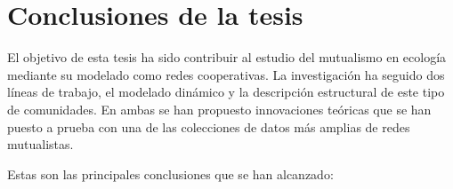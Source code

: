 
\chapter{Conclusiones de la tesis} %

\label{chapterCONCLUSIONES} %

El objetivo de esta tesis ha sido contribuir al estudio del mutualismo en ecología mediante su modelado como redes cooperativas. La investigación ha seguido dos líneas de trabajo, el modelado dinámico y la descripción estructural de este tipo de comunidades. En ambas se han propuesto innovaciones teóricas que se han puesto a prueba con una de las colecciones de datos más amplias de redes mutualistas.

Estas son las principales conclusiones que se han alcanzado:

